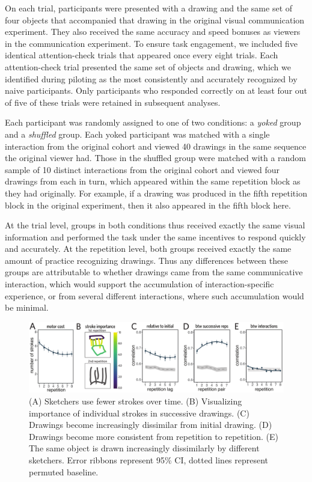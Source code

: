 \documentclass[10pt,letterpaper]{article}
\begin{document}
On each trial, participants were presented with a drawing and the same set of four objects that accompanied that drawing in the original visual communication experiment.
They also received the same accuracy and speed bonuses as viewers in the communication experiment.
To ensure task engagement, we included five identical attention-check trials that appeared once every eight trials.
Each attention-check trial presented the same set of objects and drawing, which we identified during piloting as the most consistently and accurately recognized by naive participants.
Only participants who responded correctly on at least four out of five of these trials were retained in subsequent analyses.

Each participant was randomly assigned to one of two conditions: a \textit{yoked} group and a \textit{shuffled} group.
Each yoked participant was matched with a single interaction from the original cohort and viewed 40 drawings in the same sequence the original viewer had.
Those in the shuffled group were matched with a random sample of 10 distinct interactions from the original cohort and viewed four drawings from each in turn, which appeared within the same repetition block as they had originally.
For example, if a drawing was produced in the fifth repetition block in the original experiment, then it also appeared in the fifth block here.

At the trial level, groups in both conditions thus received exactly the same visual information and performed the task under the same incentives to respond quickly and accurately.
At the repetition level, both groups received exactly the same amount of practice recognizing drawings.
Thus any differences between these groups are attributable to whether drawings came from the same communicative interaction, which would support the accumulation of interaction-specific experience, or from several different interactions, where such accumulation would be minimal.

\begin{figure}
\includegraphics[width=0.94\linewidth]{figures/drawing_changes.pdf}
\caption{(A) Sketchers use fewer strokes over time. (B) Visualizing importance of individual strokes in successive drawings. (C) Drawings become increasingly dissimilar from initial drawing. (D) Drawings become more consistent from repetition to repetition. %
(E) The same object is drawn increasingly dissimilarly by different sketchers. %
Error ribbons represent 95\% CI, dotted lines represent permuted baseline.}
\label{within-across}
\end{figure}
\end{document}
